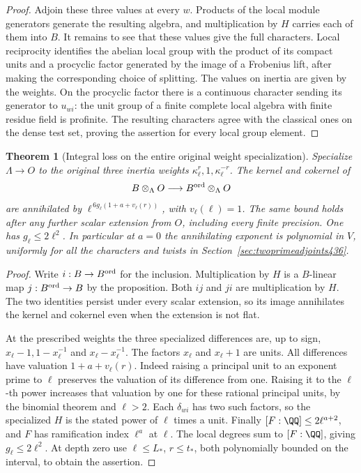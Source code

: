 \documentclass[a4paper,11pt]{article}
\newtheorem{theorem}[proposition]{Theorem}
\theoremstyle{definition}
\theoremstyle{remark}
\numberwithin{equation}{section}
\begin{document}
\begin{proof}
Adjoin these three values at every \(w\). Products of the
local module generators generate the resulting algebra,
and multiplication by \(H\) carries each of them into \(B\).
It remains to see that these values give the full characters.
Local reciprocity identifies the abelian local group with
the product of its compact units and a procyclic factor
generated by the image of a Frobenius lift, after making the
corresponding choice of splitting. The values on inertia
are given by the weights. On the procyclic factor there is
a continuous character sending its generator to \(u_{wi}\):
the unit group of a finite complete local algebra with finite
residue field is profinite. The resulting characters agree
with the classical ones on the dense test set, proving the
assertion for every local group element.
\end{proof}

\begin{theorem}[Integral loss on the entire original weight specialization]\leavevmode
\label{thm:orderedconductor437}
Specialize \(\Lambda\to O\) to the original three inertia
weights \(\kappa_\ell^r,1,\kappa_\ell^{-r}\).
The kernel and cokernel of
\[
      B\otimes_\Lambda O\longrightarrow
                   B^{\rm ord}\otimes_\Lambda O
\]
are annihilated by
\(\ell^{\,6g_\ell(1+a+v_\ell(r))}\), with \(v_\ell(\ell)=1\).
The same bound holds after any further scalar extension
from \(O\), including every finite precision.
One has \(g_\ell\le2\ell^2\). In particular at \(a=0\) the
annihilating exponent is polynomial in \(V\), uniformly for
all the characters and twists in Section~\ref{sec:twoprimeadjoints436}.
\end{theorem}
\begin{proof}
Write \(i:B\to B^{\rm ord}\) for the inclusion.
Multiplication by \(H\) is a \(B\)-linear map
\(j:B^{\rm ord}\to B\) by the proposition. Both \(ij\)
and \(ji\) are multiplication by \(H\). The two identities
persist under every scalar extension, so its image annihilates
the kernel and cokernel even when the extension is not flat.

At the prescribed weights the three specialized differences
are, up to sign, \(x_\ell-1, 1-x_\ell^{-1}\) and
\(x_\ell-x_\ell^{-1}\). The factors \(x_\ell\) and \(x_\ell+1\)
are units. All differences have valuation
\(1+a+v_\ell(r)\). Indeed raising a principal unit to an
exponent prime to \(\ell\) preserves the valuation of its
difference from one. Raising it to the \(\ell\)-th power
increases that valuation by one for these rational principal
units, by the binomial theorem and \(\ell>2\). Each
\(\delta_{wi}\) has two such factors, so the specialized
\(H\) is the stated power of \(\ell\) times a unit. Finally
\([F:\QQ]\le2\ell^{a+2}\), and \(F\) has ramification index
\(\ell^a\) at \(\ell\). The local degrees sum to \([F:\QQ]\),
giving \(g_\ell\le2\ell^2\). At depth zero use
\(\ell\le L_*\), \(r\le t_*\), both polynomially bounded on
the interval, to obtain the assertion.
\end{proof}
\end{document}
